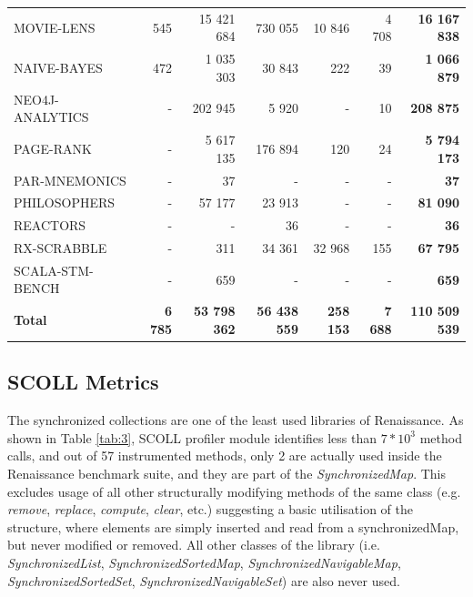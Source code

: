 \documentclass[]{usiinfthesis}
\begin{document}
\begin{table}
{\begin{tabular}{|l|r|r|r|r|r||r|}
MOVIE-LENS	&	 545 	&	 15 421 684 	&	 730 055 	&	 10 846 	&	 4 708 	& \textbf{	 16 167 838 	 }\\ 
NAIVE-BAYES	&	 472 	&	 1 035 303 	&	 30 843 	&	 222 	&	 39 	& \textbf{	 1 066 879 	 }\\ 
NEO4J-ANALYTICS	&	 -   	&	 202 945 	&	 5 920 	&	 -   	&	 10 	& \textbf{	 208 875 	 }\\ 
PAGE-RANK	&	 -   	&	 5 617 135 	&	 176 894 	&	 120 	&	 24 	& \textbf{	 5 794 173 	 }\\ 
PAR-MNEMONICS	&	 -   	&	 37 	&	 -   	&	 -   	&	 -   	& \textbf{	 37 	 }\\ 
PHILOSOPHERS	&	 -   	&	 57 177 	&	 23 913 	&	 -   	&	 -   	& \textbf{	 81 090 	 }\\ 
REACTORS	&	 -   	&	 - 	&	 36 	&	 -   	&	 -   	& \textbf{	 36 	 }\\ 
RX-SCRABBLE	&	 -   	&	 311 	&	 34 361 	&	 32 968 	&	 155 	& \textbf{	 67 795 	 }\\ 
SCALA-STM-BENCH	&	 -   	&	 659 	&	 -   	&	 -   	&	 -   	& \textbf{	 659 	 }\\ 
\hline													
\hline													
\textbf{Total}	&  \textbf{	 6 785 	} &  \textbf{	 53 798 362 	} &  \textbf{	 56 438 559 	} &  \textbf{	 258 153 	} &  \textbf{	7 688	} &  \textbf{	 110 509 539 	 }\\ 
\hline													
\end{tabular}
}
\end{table}%


\subsection{SCOLL Metrics}
The synchronized collections are one of the least used libraries of Renaissance. As shown in Table \ref{tab:3}, SCOLL profiler module identifies less than \(7*10^3\) method calls, and out of 57 instrumented methods, only 2 are actually used inside the Renaissance benchmark suite, and they are part of the \textit{SynchronizedMap}.
 This excludes usage of all other structurally modifying methods of the same class (e.g. \textit{remove}, \textit{replace}, \textit{compute}, \textit{clear}, etc.) suggesting a basic utilisation of the structure, where elements are simply inserted and read from a synchronizedMap, but never modified or removed. All other classes of the library (i.e. \textit{SynchronizedList}, \textit{SynchronizedSortedMap}, \textit{SynchronizedNavigableMap}, \textit{SynchronizedSortedSet}, \textit{SynchronizedNavigableSet}) are also never used.
 
\end{document}
